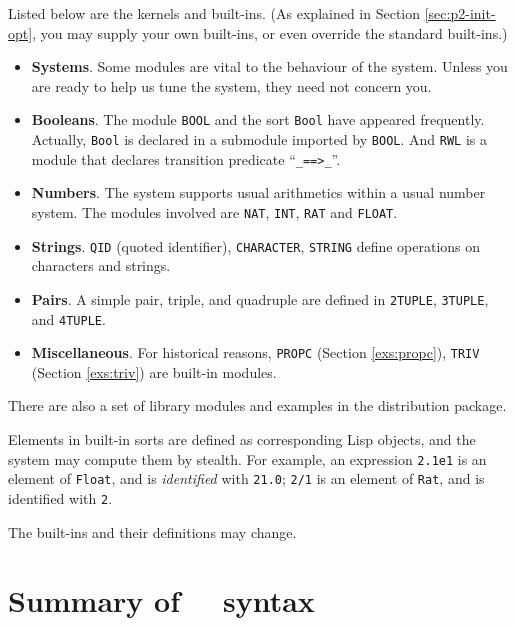 \documentclass[a4paper]{memoir}
\begin{document}
Listed below are the kernels and built-ins.
(As explained in Section \ref{sec:p2-init-opt}, you may supply your
own built-ins, or even override the standard built-ins.)
\begin{itemize}
\item[] \textbf{ Systems}. Some modules are vital to the behaviour of
  the system. Unless you are ready to help us tune the system, they
  need not concern you.
\item[] \textbf{ Booleans}. The module \verb|BOOL| and the sort \verb|Bool|
  have appeared frequently. Actually, \verb|Bool| is declared in a
  submodule imported by \verb|BOOL|. And \verb|RWL| is a module that
  declares transition predicate ``\verb|_==>_|''.
\item[] \textbf{ Numbers}. The system supports usual arithmetics within
  a usual number system. The modules involved are
  \verb|NAT|, \verb|INT|, \verb|RAT| and \verb|FLOAT|.
\item[] \textbf{ Strings}. \verb|QID| (quoted identifier),
  \verb|CHARACTER|, \verb|STRING| define operations on characters
  and strings.
\item[] \textbf{ Pairs}. A simple pair, triple, and quadruple are defined
  in \verb|2TUPLE|, \verb|3TUPLE|, and \verb|4TUPLE|.
\item[] \textbf{ Miscellaneous}. For historical reasons, \verb|PROPC|
  (Section \ref{exs:propc}), \verb|TRIV| (Section \ref{exs:triv})
   are built-in modules.
\end{itemize}
There are also a set of library modules and examples in the
distribution package.

\begin{warning}
  Elements in built-in sorts are defined as corresponding Lisp objects,
  and the system may compute them by stealth. For example,
  an expression \verb|2.1e1| is an element of \verb|Float|, and
  is {\em identified} with \verb|21.0|; \verb|2/1| is an element of
  \verb|Rat|, and is identified with \verb|2|.
\end{warning}

\begin{warning}
  The built-ins and their definitions may change.
\end{warning}

\appendix
\chapter{Summary of \cafeobj~~syntax}
\end{document}
